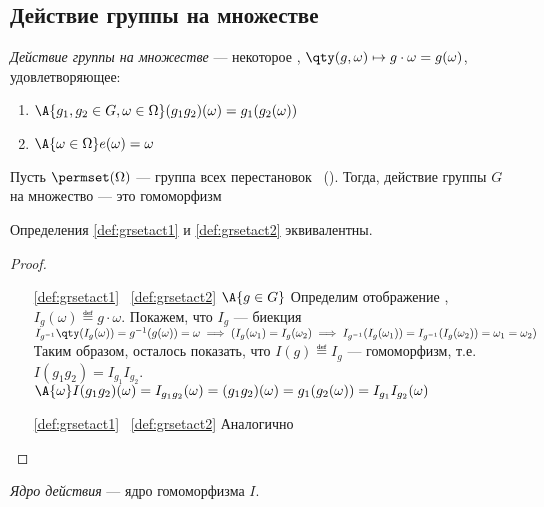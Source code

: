 \subsection{Действие группы на множестве}
\begin{definition}\label{def:grsetact1}
  \emph{Действие группы на множестве \Omega} --- некоторое , $\qty(g, \omega)\mapsto g\cdot\omega=g(\omega)$, удовлетворяющее:
  \begin{enumerate}
    \item $\A{g_1, g_2 \in G, \omega\in \Omega}(g_1g_2)(\omega)=g_1(g_2(\omega))$
    \item $\A{\omega \in \Omega} e(\omega)=\omega$
  \end{enumerate}
\end{definition}

\begin{definition}[Альтернативное]\label{def:grsetact2}
  Пусть $\permset(\Omega)$ --- группа всех перестановок \Omega\ (). Тогда, действие группы $G$ на множество \Omega --- это гомоморфизм 
\end{definition}

\begin{theorem}
  Определения \ref{def:grsetact1} и \ref{def:grsetact2} эквивалентны.
\end{theorem}
\begin{proof}
  \theoremlistshack
  \begin{itemize}[leftmargin=16ex]
    \item[\ref{def:grsetact1} \rightarrow\ \ref{def:grsetact2}] $\A{g\in G}$ Определим отображение , $I_g(\omega)\eqdef g\cdot\omega$. Покажем, что $I_g$ --- биекция\\
          $I_{g^{-1}}\qty(I_g(\omega))=g^{-1}(g(\omega))=\omega\implies  (I_g(\omega_1)=I_g(\omega_2)\implies I_{g^{-1}}(I_g(\omega_1))=I_{g^{-1}}(I_g(\omega_2))=\omega_1=\omega_2)$\\
          Таким образом, осталось показать, что $I(g)\eqdef I_g$ --- гомоморфизм, т.\:е. $I(g_1g_2)=I_{g_1}I_{g_2}$. $\A{\omega} I(g_1g_2)(\omega)=I_{g_1g_2}(\omega)=(g_1g_2)(\omega)=g_1(g_2(\omega))=I_{g_1}I_{g_2}(\omega)$
    \item[\ref{def:grsetact1} \leftarrow\ \ref{def:grsetact2}] Аналогично
  \end{itemize}
\end{proof}

\begin{definition}
  \emph{Ядро действия} --- ядро гомоморфизма $I$.
\end{definition}

